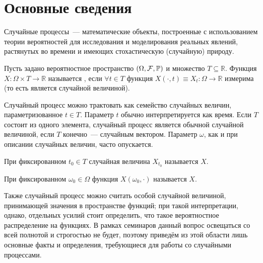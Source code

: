 \section{Основные сведения} \label{section:basics}

Случайные процессы~--- математические объекты,
построенные с использованием теории вероятностей для исследования и моделирования реальных явлений,
растянутых во времени и имеющих стохастическую (случайную) природу.

\begin{definition}
    \label{definition:basics:stochastic_process}
    Пусть задано вероятностное пространство $ (\Omega, \mathcal{F}, \mathbb{P}) $ и множество $ T \subseteq \mathbb{R} $.
    Функция $ X\colon \Omega \times T \to \mathbb{R} $ называется ,
    если $ \forall t \in T $ функция $ X(\cdot, t) \equiv X_t\colon \Omega \to \mathbb{R} $ измерима
    (то есть является случайной величиной).
\end{definition}

Случайный процесс можно трактовать как семейство случайных величин, параметризованное $ t \in T $.
Параметр $ t $ обычно интерпретируется как время.
Если $ T $ состоит из одного элемента, случайный процесс является обычной случайной величиной,
если $ T $ конечно~--- случайным вектором.
Параметр $ \omega $, как и при описании случайных величин, часто опускается.

\begin{definition}
    \label{definition:basics:stochastic_process_slice}
    При фиксированном $ t_0 \in T $ случайная величина $ X_{t_0} $ называется  $ X $.
\end{definition}

\begin{definition}
    \label{definition:basics:stochastic_process_realization}
    При фиксированном $ \omega_0 \in \Omega $ функция $ X(\omega_0, \cdot ) $ называется  $ X $.
\end{definition}

Также случайный процесс можно считать особой случайной величиной, принимающей значения в пространстве функций;
при такой интерпретации, однако, отдельных усилий стоит определить, что такое вероятностное распределение на функциях.
В рамках семинаров данный вопрос освещаться со всей полнотой и строгостью не будет,
поэтому приведём из этой области лишь основные факты и определения,
требующиеся для работы со случайными процессами.

